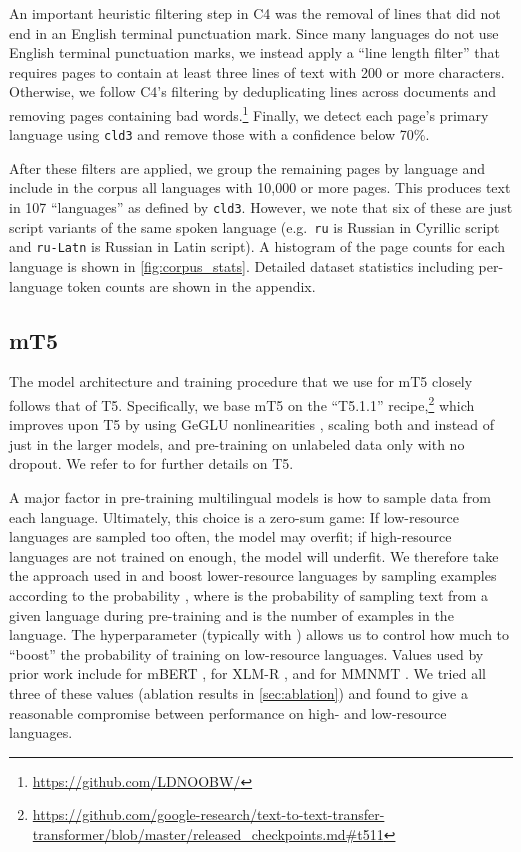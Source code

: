 \documentclass[11pt]{article}
\begin{document}
An important heuristic filtering step in C4 was the removal of lines that did not end in an English terminal punctuation mark.
Since many languages do not use English terminal punctuation marks, we instead apply a ``line length filter'' that requires pages to contain at least three lines of text with 200 or more characters.
Otherwise, we follow C4's filtering by deduplicating lines across documents and removing pages containing bad words.\footnote{\url{https://github.com/LDNOOBW/}}
Finally, we detect each page's primary language using \texttt{cld3} and remove those with a confidence below 70\%.

After these filters are applied, we group the remaining pages by language and include in the corpus all languages with 10,000 or more pages. This produces text in 107 ``languages'' as defined by \texttt{cld3}.
However, we note that six of these are just script variants of the same spoken language (e.g.\ \texttt{ru} is Russian in Cyrillic script and \texttt{ru-Latn} is Russian in Latin script).
A histogram of the page counts for each language is shown in \cref{fig:corpus_stats}. Detailed dataset statistics including per-language token counts are shown in the appendix.

\subsection{mT5}

The model architecture and training procedure that we use for mT5 closely follows that of T5.
Specifically, we base mT5 on the ``T5.1.1'' recipe,\footnote{\url{https://github.com/google-research/text-to-text-transfer-transformer/blob/master/released\_checkpoints.md\#t511}} which improves upon T5 by using GeGLU nonlinearities \citep{shazeer2020glu}, scaling both  and  instead of just  in the larger models, and pre-training on unlabeled data only with no dropout.
We refer to \citet{2020t5} for further details on T5.

A major factor in pre-training multilingual models is how to sample data from each language.
Ultimately, this choice is a zero-sum game: If low-resource languages are sampled too often, the model may overfit; if high-resource languages are not trained on enough, the model will underfit.
We therefore take the approach used in \citep{devlin2018multilingual,conneau2019unsupervised,arivazhagan2019massively} and boost lower-resource languages by sampling examples according to the probability , where  is the probability of sampling text from a given language during pre-training and  is the number of examples in the language.
The hyperparameter  (typically with ) allows us to control how much to ``boost'' the probability of training on low-resource languages.
Values used by prior work include  for mBERT \citep{devlin2018multilingual},  for XLM-R \citep{conneau2019unsupervised}, and  for MMNMT \citep{arivazhagan2019massively}.
We tried all three of these values (ablation results in \cref{sec:ablation}) and found  to give a reasonable compromise between performance on high- and low-resource languages.
\end{document}
